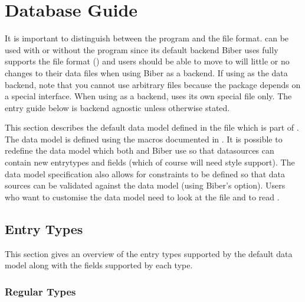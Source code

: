 \documentclass{ltxdockit}[2011/03/25]
\newcommand*{\biber}{Biber\xspace}
\begin{document}
\section{Database Guide}
\label{bib}

It is important to distinguish between \bibtex the program and \bibtex the file format.  can be used with or without \bibtex the program since its default backend \biber uses fully supports the \bibtex file format () and users should be able to move to  will little or no changes to their \bibtex data files when using \biber as a backend. If using \bibtex as the data backend, note that you cannot use arbitrary  files because the package depends on a special \bibtex interface. When using \bibtex as a backend,  uses its own special  file only. The entry guide below is backend agnostic unless otherwise stated.

This section describes the default data model defined in the  file which is part of . The data model is defined using the macros documented in . It is possible to redefine the data model which both  and \biber use so that datasources can contain new entrytypes and fields (which of course will need style support). The data model specification also allows for constraints to be defined so that data sources can be validated against the data model (using \biber's  option). Users who want to customise the data model need to look at the  file and to read .

\subsection{Entry Types}
\label{bib:typ}

This section gives an overview of the entry types supported by the default  data model along with the fields supported by each type.

\subsubsection{Regular Types}
\label{bib:typ:blx}
\end{document}
